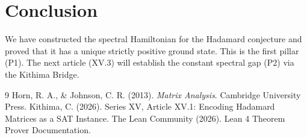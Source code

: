 \documentclass[11pt,a4paper]{article}
\begin{document}
\section{Conclusion}

We have constructed the spectral Hamiltonian for the Hadamard conjecture and proved that it has a unique strictly positive ground state. This is the first pillar (P1). The next article (XV.3) will establish the constant spectral gap (P2) via the Kithima Bridge.


\begin{thebibliography}{9}
  Horn, R. A., \& Johnson, C. R. (2013). \emph{Matrix Analysis}. Cambridge University Press.
  Kithima, C. (2026). Series XV, Article XV.1: Encoding Hadamard Matrices as a SAT Instance.
  The Lean Community (2026). Lean 4 Theorem Prover Documentation.
\end{thebibliography}
\end{document}
